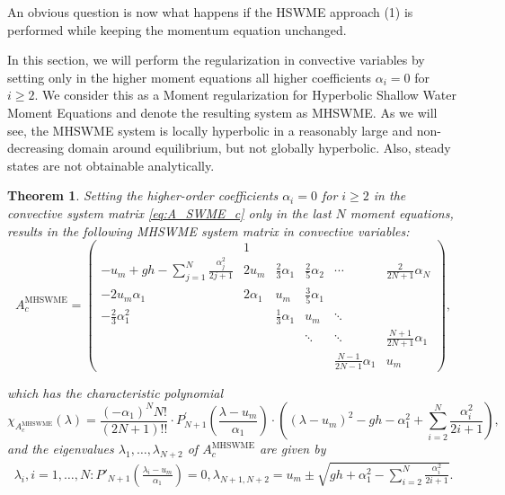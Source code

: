 \documentclass[a4paper, 11pt]{article}
\newtheorem{theorem}{Theorem}
\begin{document}
An obvious question is now what happens if the HSWME approach (1) is performed while keeping the momentum equation unchanged.

In this section, we will perform the regularization in convective variables by setting only in the higher moment equations all higher coefficients $\alpha_i=0$ for $i\geq 2$. We consider this as a Moment regularization for Hyperbolic Shallow Water Moment Equations and denote the resulting system as MHSWME. As we will see, the MHSWME system is locally hyperbolic in a reasonably large and non-decreasing domain around equilibrium, but not globally hyperbolic. Also, steady states are not obtainable analytically.

\begin{theorem}\label{th:hybrid_convective_system}
    Setting the higher-order coefficients $\alpha_i=0$ for $i\geq 2$ in the convective system matrix \eqref{eq:A_SWME_c} only in the last $N$ moment equations, results in the following MHSWME system matrix in convective variables:
    \begin{equation}\label{eq:A_MHSWME_c}
        A^{\textrm{MHSWME}}_{c} =
        \left(\begin{array}{cccccc}
             & 1 &  &  &  &  \\
        - u_m + gh - \sum\limits_{j=1}^{N} \frac{\alpha_j^2}{2j+1} & 2 u_m & \frac{2}{3} \alpha_1 & \frac{2}{5} \alpha_2 &\cdots & \frac{2}{2 N+1} \alpha_N \\
            -2u_m \alpha_1 & 2\alpha_1 & u_m & \frac{3}{5} \alpha_1 & &\\
            -\frac{2}{3}\alpha_1^2 &   & \frac{1}{3}\alpha_1 & u_m & \ddots & \\
             &  &  & \ddots & \ddots & \frac{N+1}{2N+1}\alpha_1 \\
             &  &  &  & \frac{N-1}{2N-1}\alpha_1 & u_m
        \end{array}\right),
    \end{equation}

    which has the characteristic polynomial
    \begin{equation}\label{eq:A_MHSWME_char}
        \chi_{A^{\textrm{MHSWME}}_{c}}(\lambda) = \frac{(-\alpha_1)^NN!}{(2N+1)!!} \cdot P^{'}_{N+1}\left(\frac{\lambda-u_m}{\alpha_1}\right) \cdot \left( \left( \lambda - u_m \right)^2 - gh - \alpha_1^2 + \sum\limits_{i=2}^N\frac{\alpha_i^2}{2i+1}\right),
    \end{equation}
    and the eigenvalues $\lambda_1, \ldots, \lambda_{N+2}$ of $A^{\textrm{MHSWME}}_{c}$ are given by
    \begin{eqnarray}\label{eq:A_MHSWME_EV}
        \lambda_i, i=1,\ldots, N: P'_{N+1}\left(\frac{\lambda_i - u_m}{\alpha_1}\right)=0,
        \lambda_{N+1,N+2} = u_m \pm \sqrt{gh + \alpha_1^2 - \sum\limits_{i=2}^N\frac{\alpha_i^2}{2i+1}}.\\
    \end{eqnarray}
\end{theorem}
\end{document}
